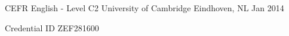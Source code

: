 \begin{cventries}
  \cventry
    {CEFR English - Level C2} %
    {University of Cambridge} %
    {Eindhoven, NL} %
    {Jan 2014} %
    {
      \begin{cvitems} %
        \item Credential ID ZEF281600
      \end{cvitems}
    }
    

\end{cventries}
